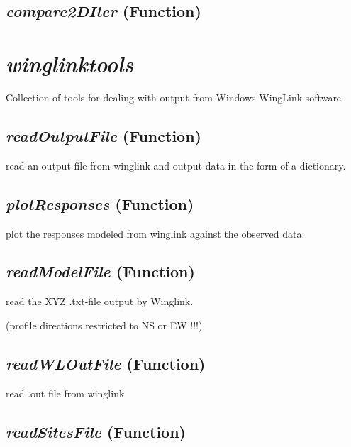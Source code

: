 \subsection{\textit{compare2DIter} (Function)}
\label{sssec:.modeling.occamtools.compare2DIter}






\section{\textit{winglinktools} }
\label{sec:modeling.winglinktools}


Collection of tools for dealing with output from Windows WingLink software

\subsection{\textit{readOutputFile} (Function)}
\label{ssec:.modeling.winglinktools.readOutputFile}

read an output file from winglink and output data
    in the form of a dictionary.

\subsection{\textit{plotResponses} (Function)}
\label{ssec:.modeling.winglinktools.plotResponses}

plot the responses modeled from winglink against the
    observed data.

\subsection{\textit{readModelFile} (Function)}
\label{ssec:.modeling.winglinktools.readModelFile}

read  the XYZ .txt-file output by Winglink.

(profile directions restricted to NS or EW !!!)

\subsection{\textit{readWLOutFile} (Function)}
\label{ssec:.modeling.winglinktools.readWLOutFile}

read .out file from winglink

\subsection{\textit{readSitesFile} (Function)}
\label{ssec:.modeling.winglinktools.readSitesFile}

